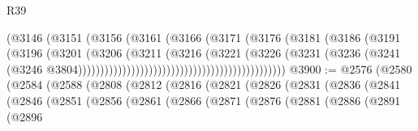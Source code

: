 \begin{lexlean}{R39}
\begin{coremodule}
                                                        (@3146
                                                          (@3151
                                                            (@3156
                                                              (@3161
                                                                (@3166
                                                                  (@3171
                                                                    (@3176
                                                                      (@3181
                                                                        (@3186
                                                                          (@3191
                                                                            (@3196
                                                                              (@3201
                                                                                (@3206
                                                                                  (@3211
                                                                                    (@3216
                                                                                      (@3221
                                                                                        (@3226
                                                                                          (@3231
                                                                                            (@3236
                                                                                              (@3241
                                                                                                (@3246
                                                                                                  @3804)))))))))))))))))))))))))))))))))))))))))))))))
@3900 := @2576
    (@2580
      (@2584
        (@2588
          (@2808
            (@2812
              (@2816
                (@2821
                  (@2826
                    (@2831
                      (@2836
                        (@2841
                          (@2846
                            (@2851
                              (@2856
                                (@2861
                                  (@2866
                                    (@2871
                                      (@2876
                                        (@2881
                                          (@2886
                                            (@2891
                                              (@2896

\end{coremodule}
\end{lexlean}
